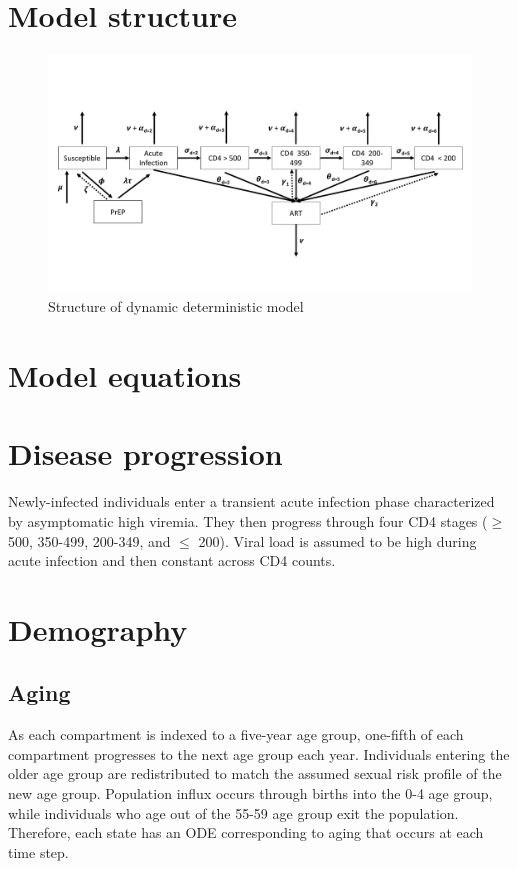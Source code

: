 \documentclass[11pt,a4paper]{article}
\begin{document}
\section{Model structure}
\begin{figure}[H]
\centering
\caption{Structure of dynamic deterministic model}
\includegraphics[width = 175mm]{prep-dc2m-diagram.pdf}
\end{figure}

\section{Model equations}

\section{Disease progression}
Newly-infected individuals enter a transient acute infection phase characterized by asymptomatic high viremia. They then progress through four CD4 stages ($\geq$ 500, 350-499, 200-349, and $\leq$ 200). Viral load is assumed to be high during acute infection and then constant across CD4 counts.

\section{Demography}
	\subsection{Aging}
	As each compartment is indexed to a five-year age group, one-fifth of each compartment progresses to the next age group each year. Individuals entering the older age group are redistributed to match the assumed sexual risk profile of the new age group. Population influx occurs through births into the 0-4 age group, while individuals who age out of the 55-59 age group exit the population. Therefore, each state has an ODE corresponding to aging that occurs at each time step.
\end{document}
